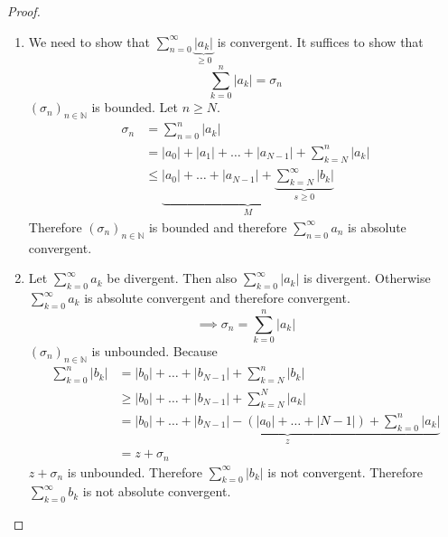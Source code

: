 \documentclass[a4paper,landscape,twocolumn]{article}
\theoremstyle{definition}
\newcommand\abs[1]{\left|#1\right|}
\newcommand\seq[1]{{\left(#1\right)}_{n \in \mathbb N}}
\begin{document}
\begin{proof}
  \begin{enumerate}
    \item
      We need to show that $\sum_{n=0}^\infty \underbrace{\abs{a_k}}_{\geq 0}$ is convergent.
      It suffices to show that
      \[ \sum_{k=0}^n \abs{a_k} = \sigma_n \]
      $\seq{\sigma_n}$ is bounded. Let $n \geq N$.
      \begin{align*}
        \sigma_n &= \sum_{n=0}^n \abs{a_k} \\
          &= \abs{a_0} + \abs{a_1} + \dots + \abs{a_{N-1}} + \sum_{k=N}^n \abs{a_k} \\
          &\leq \underbrace{\abs{a_0} + \dots + \abs{a_{N-1}} + \underbrace{\sum_{k=N}^\infty \abs{b_k}}_{s \geq 0}}_{M}
      \end{align*}
      Therefore $\seq{\sigma_n}$ is bounded and therefore $\sum_{n=0}^\infty a_n$ is absolute convergent.
    \item
      Let $\sum_{k=0}^\infty a_k$ be divergent. Then also $\sum_{k=0}^\infty \abs{a_k}$ is divergent.
      Otherwise $\sum_{k=0}^\infty a_k$ is absolute convergent and therefore convergent.
      \[ \implies \sigma_n = \sum_{k=0}^n \abs{a_k} \]
      $\seq{\sigma_n}$ is unbounded. Because
      \begin{align*}
        \sum_{k=0}^n \abs{b_k}
          &= \abs{b_0} + \dots + \abs{b_{N-1}} + \sum_{k=N}^n \abs{b_k} \\
          &\geq \abs{b_0} + \dots + \abs{b_{N-1}} + \sum_{k=N}^N \abs{a_k} \\
          &= \underbrace{\abs{b_0} + \dots + \abs{b_{N-1}} - \left(\abs{a_0} + \dots + \abs{N-1}\right) + \sum_{k=0}^n \abs{a_k}}_{z} \\
          &= z + \sigma_n
      \end{align*}
      $z + \sigma_n$ is unbounded. Therefore $\sum_{k=0}^\infty \abs{b_k}$ is not convergent.
      Therefore $\sum_{k=0}^\infty b_k$ is not absolute convergent.
  \end{enumerate}
\end{proof}
%
\end{document}
